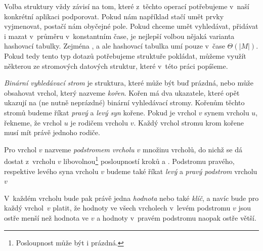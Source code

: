 Volba struktury vždy závisí na tom, které z~těchto
operací potřebujeme v~naší konkrétní aplikaci podporovat. Pokud nám například
stačí umět prvky vyjmenovat, postačí nám obyčejné pole. Pokud chceme umět
vyhledávat, přidávat i mazat v~průměru v~konstantním čase, je nejlepší volbou nějaká
varianta hashovací tabulky. Zejména ,  a  ale hashovací
tabulka umí pouze v~čase $\Theta(|M|)$. Pokud tedy tento typ dotazů potřebujeme
struktuře pokládat, můžeme využít některou ze stromových datových struktur,
které v~této práci popíšeme.

\begin{definice}

\emph{Binární vyhledávací strom} je struktura, které může být buď prázdná, nebo
může obsahovat vrchol, který nazveme \emph{kořen}. Kořen má dva ukazatele,
které opět ukazují na (ne nutně neprázdné) binární vyhledávací stromy. Kořenům těchto stromů budeme říkat \emph{pravý} a \emph{levý syn} kořene. Pokud je vrchol $v$ synem vrcholu $u$, řekneme, že vrchol $u$ je rodičem vrcholu $v$. Každý vrchol stromu krom kořene musí mít právě jednoho rodiče. 

Pro vrchol $v$ nazveme
\emph{podstromem vrcholu $v$} množinu vrcholů, do nichž se dá dostat z~vrcholu
$v$ libovolnou\footnote{Posloupnost může být i prázdná.} posloupností kroků 
 a . Podstromu pravého, respektive levého syna vrcholu $v$ budeme také říkat \emph{levý} a \emph{pravý podstrom} vrcholu $v$

V~každém vrcholu bude pak právě jedna \emph{hodnota} nebo také \emph{klíč}, a navíc bude pro každý vrchol~$v$ platit, že hodnoty ve všech vrcholech v~levém podstromu $v$ jsou ostře menší než hodnota ve $v$ a hodnoty v~pravém podstromu naopak ostře větší.
\end{definice}

